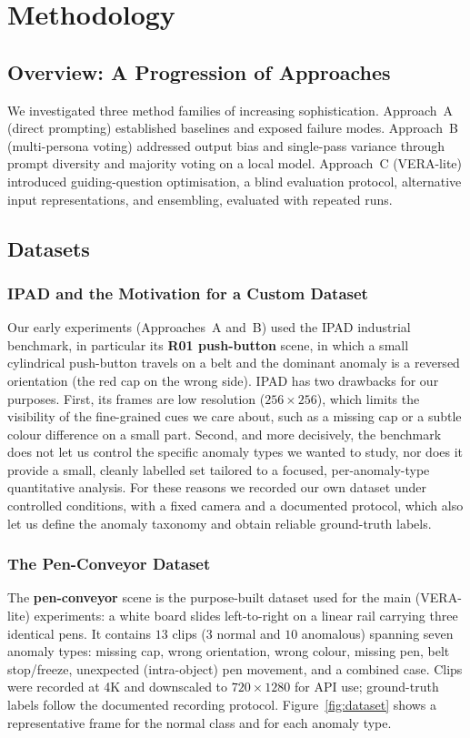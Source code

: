 \chapter{Methodology}
\label{chap:method}

\section{Overview: A Progression of Approaches}
We investigated three method families of increasing sophistication. Approach~A
(direct prompting) established baselines and exposed failure modes. Approach~B
(multi-persona voting) addressed output bias and single-pass variance through prompt
diversity and majority voting on a local model. Approach~C (VERA-lite) introduced
guiding-question optimisation, a blind evaluation protocol, alternative input
representations, and ensembling, evaluated with repeated runs.

\section{Datasets}

\subsection{IPAD and the Motivation for a Custom Dataset}
Our early experiments (Approaches~A and~B) used the IPAD industrial benchmark, in
particular its \textbf{R01 push-button} scene, in which a small cylindrical push-button
travels on a belt and the dominant anomaly is a reversed orientation (the red cap on the
wrong side). IPAD has two drawbacks for our purposes. First, its frames are low
resolution ($256\times256$), which limits the visibility of the fine-grained cues we care
about, such as a missing cap or a subtle colour difference on a small part. Second, and
more decisively, the benchmark does not let us control the specific anomaly types we wanted
to study, nor does it provide a small, cleanly labelled set tailored to a focused,
per-anomaly-type quantitative analysis. For these reasons we recorded our own dataset
under controlled conditions, with a fixed camera and a documented protocol, which also let
us define the anomaly taxonomy and obtain reliable ground-truth labels.

\subsection{The Pen-Conveyor Dataset}
The \textbf{pen-conveyor} scene is the purpose-built dataset used for the main (VERA-lite)
experiments: a white board slides left-to-right on a linear rail carrying three identical
pens. It contains $13$ clips ($3$ normal and $10$ anomalous) spanning seven anomaly types:
missing cap, wrong orientation, wrong colour, missing pen, belt stop/freeze, unexpected
(intra-object) pen movement, and a combined case. Clips were recorded at 4K and downscaled
to $720\times1280$ for API use; ground-truth labels follow the documented recording
protocol. Figure~\ref{fig:dataset} shows a representative frame for the normal class and
for each anomaly type.

